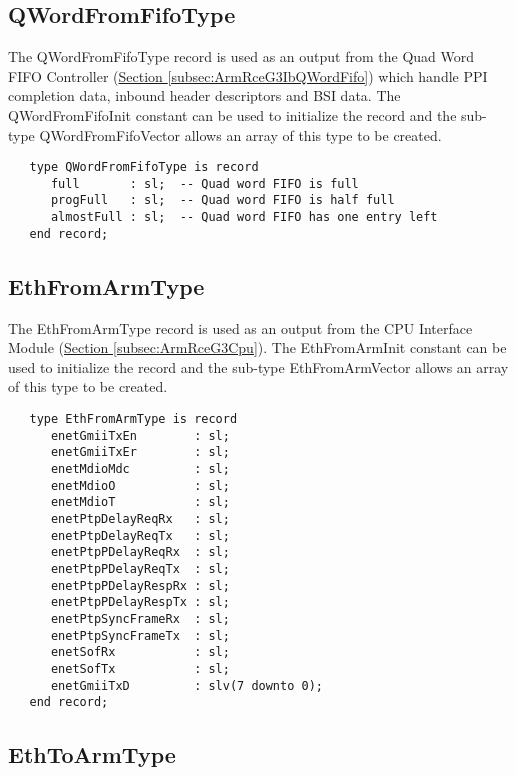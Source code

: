 \documentclass[11pt]{article}
\begin{document}
\subsection{QWordFromFifoType}
\label{subsec:QWordFromFifoType}

The QWordFromFifoType record is used as an output from the Quad Word FIFO Controller (\hyperref[subsec:ArmRceG3IbQWordFifo]{Section \ref*{subsec:ArmRceG3IbQWordFifo}}) which handle PPI completion data, inbound header descriptors and BSI data.
The QWordFromFifoInit constant can be used to initialize the record and the sub-type QWordFromFifoVector allows an array of this type to be created.

\small
\begin{verbatim}
   type QWordFromFifoType is record
      full       : sl;  -- Quad word FIFO is full
      progFull   : sl;  -- Quad word FIFO is half full
      almostFull : sl;  -- Quad word FIFO has one entry left
   end record;
\end{verbatim}
\normalsize

\subsection{EthFromArmType}
\label{subsec:EthFromArmType}

The EthFromArmType record is used as an output from the CPU Interface Module (\hyperref[subsec:ArmRceG3Cpu]{Section \ref*{subsec:ArmRceG3Cpu}}).
The EthFromArmInit constant can be used to initialize the record and the sub-type EthFromArmVector allows an array of this type to be created.

\small
\begin{verbatim}
   type EthFromArmType is record
      enetGmiiTxEn        : sl;
      enetGmiiTxEr        : sl;
      enetMdioMdc         : sl;
      enetMdioO           : sl;
      enetMdioT           : sl;
      enetPtpDelayReqRx   : sl;
      enetPtpDelayReqTx   : sl;
      enetPtpPDelayReqRx  : sl;
      enetPtpPDelayReqTx  : sl;
      enetPtpPDelayRespRx : sl;
      enetPtpPDelayRespTx : sl;
      enetPtpSyncFrameRx  : sl;
      enetPtpSyncFrameTx  : sl;
      enetSofRx           : sl;
      enetSofTx           : sl;
      enetGmiiTxD         : slv(7 downto 0);  
   end record;
\end{verbatim}
\normalsize

\subsection{EthToArmType}
\label{subsec:EthToArmType}
\end{document}
